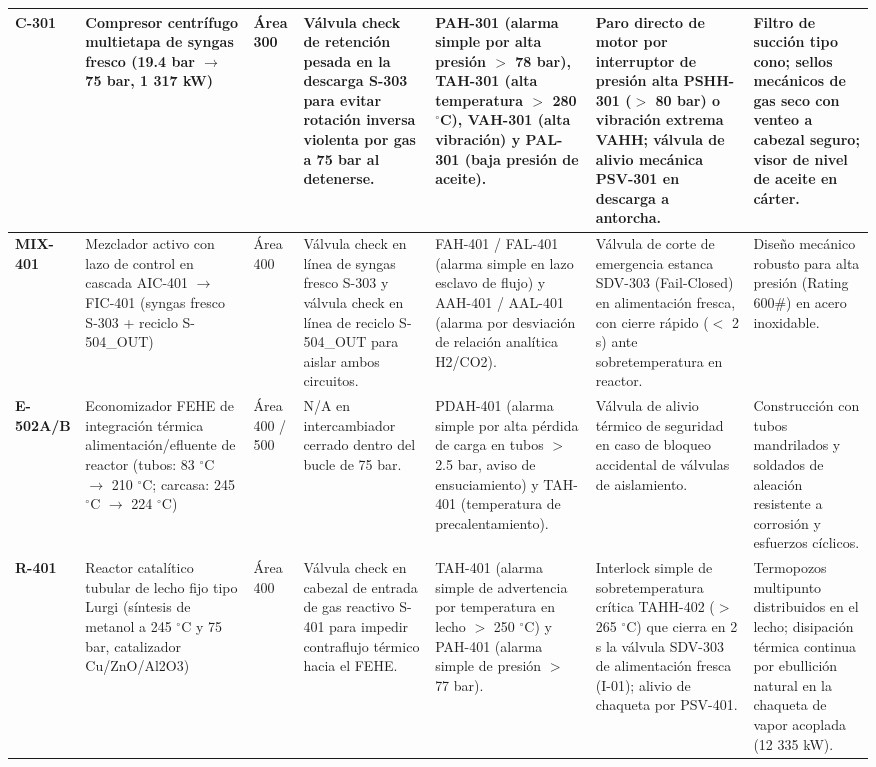 \documentclass[10pt,letterpaper]{article}
\begin{document}
\begin{landscape}
\begin{xltabular}{\linewidth}{|l|p{2.8cm}|p{1.2cm}|>{\raggedright\arraybackslash}X|>{\raggedright\arraybackslash}X|>{\raggedright\arraybackslash}X|p{2.8cm}|}
\textbf{C-301} & Compresor centrífugo multietapa de syngas fresco (19.4 bar $\to$ 75 bar, 1 317 kW) & Área 300 & Válvula check de retención pesada en la descarga S-303 para evitar rotación inversa violenta por gas a 75 bar al detenerse. & PAH-301 (alarma simple por alta presión $>$ 78 bar), TAH-301 (alta temperatura $>$ 280 $^\circ$C), VAH-301 (alta vibración) y PAL-301 (baja presión de aceite). & Paro directo de motor por interruptor de presión alta PSHH-301 ($>$ 80 bar) o vibración extrema VAHH; válvula de alivio mecánica PSV-301 en descarga a antorcha. & Filtro de succión tipo cono; sellos mecánicos de gas seco con venteo a cabezal seguro; visor de nivel de aceite en cárter. \\ \hline
\textbf{MIX-401} & Mezclador activo con lazo de control en cascada AIC-401 $\to$ FIC-401 (syngas fresco S-303 + reciclo S-504\_\allowbreak OUT) & Área 400 & Válvula check en línea de syngas fresco S-303 y válvula check en línea de reciclo S-504\_\allowbreak OUT para aislar ambos circuitos. & FAH-401 / FAL-401 (alarma simple en lazo esclavo de flujo) y AAH-401 / AAL-401 (alarma por desviación de relación analítica H2/CO2). & Válvula de corte de emergencia estanca SDV-303 (Fail-Closed) en alimentación fresca, con cierre rápido ($<$ 2 s) ante sobretemperatura en reactor. & Diseño mecánico robusto para alta presión (Rating 600\#) en acero inoxidable. \\ \hline
\textbf{E-502A/B} & Economizador FEHE de integración térmica alimentación/efluente de reactor (tubos: 83 $^\circ$C $\to$ 210 $^\circ$C; carcasa: 245 $^\circ$C $\to$ 224 $^\circ$C) & Área 400 / 500 & N/A en intercambiador cerrado dentro del bucle de 75 bar. & PDAH-401 (alarma simple por alta pérdida de carga en tubos $>$ 2.5 bar, aviso de ensuciamiento) y TAH-401 (temperatura de precalentamiento). & Válvula de alivio térmico de seguridad en caso de bloqueo accidental de válvulas de aislamiento. & Construcción con tubos mandrilados y soldados de aleación resistente a corrosión y esfuerzos cíclicos. \\ \hline
\textbf{R-401} & Reactor catalítico tubular de lecho fijo tipo Lurgi (síntesis de metanol a 245 $^\circ$C y 75 bar, catalizador Cu/ZnO/Al2O3) & Área 400 & Válvula check en cabezal de entrada de gas reactivo S-401 para impedir contraflujo térmico hacia el FEHE. & TAH-401 (alarma simple de advertencia por temperatura en lecho $>$ 250 $^\circ$C) y PAH-401 (alarma simple de presión $>$ 77 bar). & Interlock simple de sobretemperatura crítica TAHH-402 ($>$ 265 $^\circ$C) que cierra en 2 s la válvula SDV-303 de alimentación fresca (I-01); alivio de chaqueta por PSV-401. & Termopozos multipunto distribuidos en el lecho; disipación térmica continua por ebullición natural en la chaqueta de vapor acoplada (12 335 kW). \\ \hline

\end{xltabular}
\end{landscape}
\end{document}
